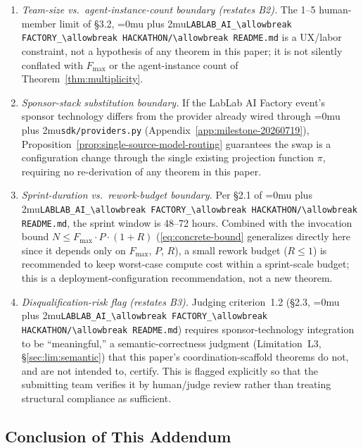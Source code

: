 \documentclass[12pt]{article}
\theoremstyle{definition}
\DeclareRobustCommand{\code}[1]{\begingroup\Urlmuskip=0mu plus 2mu\relax\nolinkurl{#1}\endgroup}
\newcommand{\LabLabFactoryReadme}{\code{LABLAB\_AI\_\allowbreak FACTORY\_\allowbreak HACKATHON/\allowbreak README.md}}
\begin{document}
\begin{enumerate}
    \item[BC1] \emph{Team-size vs.\ agent-instance-count boundary
              (restates B2).}  The 1--5 human-member limit of \S3.2,
              \LabLabFactoryReadme{} is a UX/labor constraint, not a
              hypothesis of any theorem in this paper; it is not
              silently conflated with $F_{\max}$ or the agent-instance
              count of Theorem~\ref{thm:multiplicity}.
    \item[BC2] \emph{Sponsor-stack substitution boundary.}  If the
              LabLab AI Factory event's sponsor technology differs
              from the provider already wired through
              \code{sdk/providers.py} (Appendix~\ref{app:milestone-20260719}),
              Proposition~\ref{prop:single-source-model-routing}
              guarantees the swap is a configuration change through the
              single existing projection function $\pi$, requiring no
              re-derivation of any theorem in this paper.
    \item[BC3] \emph{Sprint-duration vs.\ rework-budget boundary.}
              Per \S2.1 of \LabLabFactoryReadme{}, the sprint window is
              48--72 hours.  Combined with the invocation bound
              $N \leq F_{\max}\cdot P\cdot(1+R)$ (\eqref{eq:concrete-bound}
              generalizes directly here since it depends only on
              $F_{\max}$, $P$, $R$), a small rework budget ($R \leq 1$)
              is recommended to keep worst-case compute cost within a
              sprint-scale budget; this is a deployment-configuration
              recommendation, not a new theorem.
    \item[BC4] \emph{Disqualification-risk flag (restates B3).}
              Judging criterion~1.2 (\S2.3, \LabLabFactoryReadme{})
              requires sponsor-technology integration to be
              ``meaningful,'' a semantic-correctness judgment
              (Limitation~L3, \S\ref{sec:lim:semantic}) that this
              paper's coordination-scaffold theorems do not, and are
              not intended to, certify.  This is flagged explicitly so
              that the submitting team verifies it by human/judge
              review rather than treating structural compliance as
              sufficient.
\end{enumerate}

\subsection{Conclusion of This Addendum}
\label{app:lablab-factory-conclusion}
\end{document}
